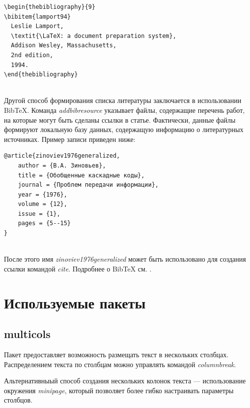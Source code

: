 \begin{minipage}{\linewidth} %
\begin{verbatim}
\begin{thebibliography}{9}
\bibitem{lamport94}
  Leslie Lamport,
  \textit{\LaTeX: a document preparation system},
  Addison Wesley, Massachusetts,
  2nd edition,
  1994.
\end{thebibliography}
\end{verbatim}
\end{minipage}\\[1em]

Другой способ формирования списка литературы заключается в использовании BibTeX.
Команда {\em addbibresource} указывает файлы, содержащие перечень работ, на которые могут быть сделаны ссылки в статье.
Фактически, данные файлы формируют локальную базу данных, содержащую информацию о литературных источниках.
Пример записи приведен ниже:\\[1em]

\begin{minipage}{\linewidth} %
\begin{verbatim}
@article{zinoviev1976generalized,
    author = {В.А. Зиновьев},
    title = {Обобщенные каскадные коды},
    journal = {Проблем передачи информации},
    year = {1976},
    volume = {12},
    issue = {1},
    pages = {5--15}
}
\end{verbatim}
\end{minipage}\\[1em]

После этого имя {\em zinoviev1976generalized} может быть использовано для создания ссылки командой {\em cite}.
Подробнее о BibTeX см. \cite{latexBib}.

\clearpage
\section{Используемые пакеты}
\subsection{multicols}
Пакет предоставляет возможность размещать текст в нескольких столбцах.
Распределением текста по столбцам можно управлять командой {\em columnbreak}.

Альтернативныый способ создания нескольких колонок текста --- использование окружения {\em minipage}, который позволяет более гибко настраивать параметры столбцов.

